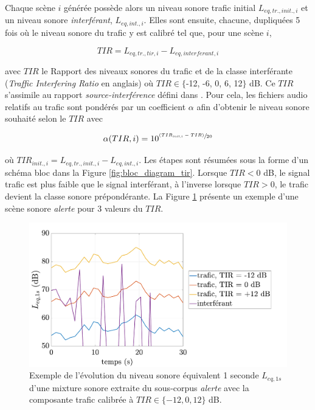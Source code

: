 Chaque scène $i$ générée possède alors un niveau sonore trafic initial $L_{eq,tr.,init.,i}$ et un niveau sonore \textit{interférant}, $L_{eq,int.,i}$. Elles sont ensuite, chacune, dupliquées 5 fois où le niveau sonore du trafic y est calibré tel que, pour une scène $i$, 

\begin{equation}
TIR = L_{eq,tr., tir, i} - L_{eq,interferant, i}
\end{equation}

avec $TIR$ le Rapport des niveaux sonores du trafic et de la classe interférante (\textit{Traffic Interfering Ratio} en anglais) où $TIR \in \lbrace$-12, -6, 0, 6, 12$\rbrace$ dB. Ce $TIR$ s'assimile au rapport \textit{source-interférence} défini dans \cite{vincent2006performance}. Pour cela, les fichiers audio relatifs au trafic sont pondérés par un coefficient $\alpha$ afin d'obtenir le niveau sonore souhaité selon le $TIR$ avec

\begin{equation}
\alpha(TIR,i) = 10^{\sfrac{(TIR_{init,i}-TIR)}{20}}
\end{equation}

où $TIR_{init.,i} = L_{eq,tr.,init.,i}-L_{eq,int.,i}$. Les étapes sont résumées sous la forme d'un schéma bloc dans la Figure \ref{fig:bloc_diagram_tir}. Lorsque $TIR < 0$ dB, le signal trafic est plus faible que le signal interférant, à l'inverse lorsque $TIR>0$, le trafic devient la classe sonore prépondérante. La Figure \ref{fig:exemple_TIR} présente un exemple d'une scène sonore \textit{alerte} pour 3 valeurs du $TIR$.\\

\begin{figure}[ht]
\centering
\includegraphics[width=0.7\linewidth]{./figures/NMF/Lp_TIR.pdf}
\caption{Exemple de l'évolution du niveau sonore équivalent 1 seconde $L_{eq,1s}$ d'une mixture sonore extraite du sous-corpus \textit{alerte} avec la composante trafic calibrée à $TIR \in \lbrace-12, 0, 12\rbrace$ dB.}
\label{fig:exemple_TIR}
\end{figure}


